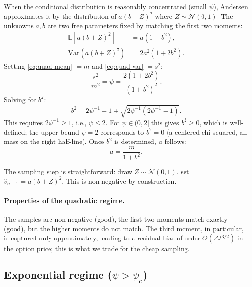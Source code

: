 \documentclass[11pt]{article}
\theoremstyle{plain}
\theoremstyle{definition}
\theoremstyle{remark}
\begin{document}
When the conditional distribution is reasonably concentrated (small $\psi$), Andersen approximates it by the distribution of $a(b + Z)^2$ where $Z \sim \mathcal{N}(0, 1)$. The unknowns $a, b$ are two free parameters fixed by matching the first two moments:
\begin{align}
    \mathbb{E}[a(b + Z)^2] &= a(1 + b^2),                                                                       \label{eq:quad-mean}\\
    \mathrm{Var}(a(b + Z)^2) &= 2 a^2 (1 + 2 b^2).                                                              \label{eq:quad-var}
\end{align}
Setting \eqref{eq:quad-mean} $= m$ and \eqref{eq:quad-var} $= s^2$:
\[
    \frac{s^2}{m^2} = \psi = \frac{2(1 + 2b^2)}{(1 + b^2)^2}.
\]
Solving for $b^2$:
\begin{equation}
    b^2 = 2\psi^{-1} - 1 + \sqrt{2\psi^{-1}(2\psi^{-1} - 1)}.                                                   \label{eq:b2}
\end{equation}
This requires $2\psi^{-1} \geq 1$, i.e., $\psi \leq 2$. For $\psi \in (0, 2]$ this gives $b^2 \geq 0$, which is well-defined; the upper bound $\psi = 2$ corresponds to $b^2 = 0$ (a centered chi-squared, all mass on the right half-line). Once $b^2$ is determined, $a$ follows:
\begin{equation}
    a = \frac{m}{1 + b^2}.                                                                                      \label{eq:a-quad}
\end{equation}

The sampling step is straightforward: draw $Z \sim \mathcal{N}(0, 1)$, set $\hat v_{n+1} = a(b + Z)^2$. This is non-negative by construction.

\paragraph{Properties of the quadratic regime.} The samples are non-negative (good), the first two moments match exactly (good), but the higher moments do not match. The third moment, in particular, is captured only approximately, leading to a residual bias of order $O(\Delta t^{3/2})$ in the option price; this is what we trade for the cheap sampling.

\subsection{Exponential regime ($\psi > \psi_c$)}
\end{document}
